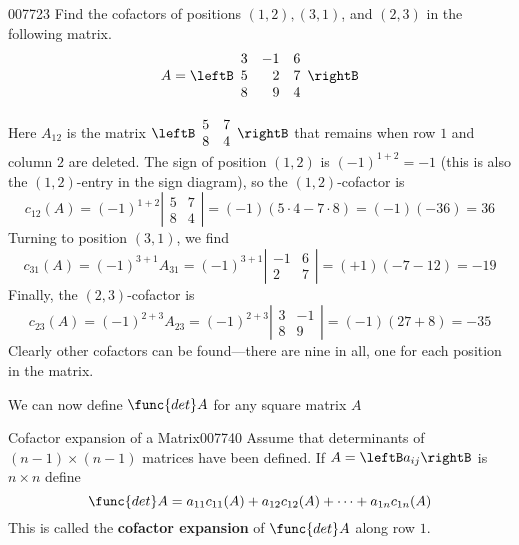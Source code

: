 \begin{example}{}{007723}
Find the cofactors of positions $(1, 2), (3, 1)$, and $(2, 3)$ in the following matrix.
\begin{equation*}
A = \leftB \begin{array}{rrr}
3 & -1 & 6 \\
5 & 2 & 7 \\
8 & 9 & 4
\end{array} \rightB
\end{equation*}
\begin{solution}
Here $A_{12}$ is the matrix $\leftB \begin{array}{rr}
5 & 7 \\
8 & 4 
\end{array} \rightB$ 
 that remains when row $1$ and column $2$ are deleted. The sign of position $(1, 2)$ is $(-1)^{1+2} = -1$ (this is also the $(1, 2)$-entry in the sign diagram), so the $(1, 2)$-cofactor is
\begin{equation*}
c_{12}(A) = (-1)^{1+2} \left| \begin{array}{rr}
5 & 7 \\
8 & 4 
\end{array} \right| 
=
(-1)(5 \cdot 4 - 7 \cdot 8) = (-1)(-36)=36
\end{equation*}
Turning to position $(3, 1)$, we find
\begin{equation*}
c_{31}(A) = (-1)^{3+1}A_{31}= (-1)^{3+1} \left| \begin{array}{rr}
-1 & 6 \\
2 & 7 
\end{array} \right| 
=(+1)(-7-12)=-19
\end{equation*}
Finally, the $(2, 3)$-cofactor is
\begin{equation*}
c_{23}(A) = (-1)^{2+3}A_{23}= (-1)^{2+3} \left| \begin{array}{rr}
3 & -1 \\
8 & 9 
\end{array} \right| 
=
(-1)(27+8)=-35
\end{equation*}
Clearly other cofactors can be found---there are nine in all, one for each position in the matrix.
\end{solution}
\end{example}

We can now define $\func{det } A$ for any square matrix $A$

\begin{definition}{Cofactor expansion of a Matrix}{007740}
Assume that determinants of $(n - 1) \times (n - 1)$ matrices have been defined. If $A = \leftB a_{ij} \rightB$ is $n \times n$ define
\begin{equation*}
\func{det } A = a_{11}c_{11}(A) +  a_{12}c_{12}(A) + \cdots +  a_{1n}c_{1n}(A)
\end{equation*}
This is called the \textbf{cofactor expansion} of $\func{det } A$ along row $1$. 
\end{definition}

